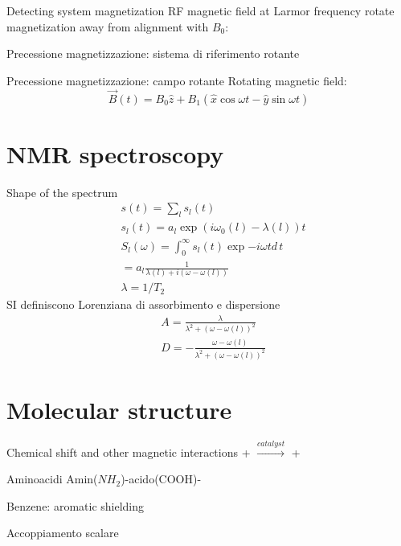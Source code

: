 \begin{frame}{Detecting system magnetization}
RF magnetic field at Larmor frequency rotate magnetization away from alignment with $B_0$:
\end{frame}

\begin{frame}{Precessione magnetizzazione: sistema di riferimento rotante}

\end{frame}

\begin{frame}{Precessione magnetizzazione: campo rotante}
   Rotating magnetic field:
   \begin{equation*}
   \vec{B}(t)=B_0\hat{z}+B_1(\hat{x}\cos{\omega t}-\hat{y}\sin{\omega t})
   \end{equation*}
\end{frame}

\section{NMR spectroscopy}

\begin{frame}{Shape of the spectrum}
    \begin{align*}
&s(t)=\sum_ls_l(t)\\
&s_l(t)=a_l\exp{(i\omega_0(l)-\lambda(l))t}\\
&S_l(\omega)=\int_0^{\infty}s_l(t)\exp{-i\omega t}d\,t\\
&=a_l\frac{1}{\lambda(l)+i(\omega-\omega(l))}\\
&\lambda=1/T_2
    \end{align*}
        SI definiscono Lorenziana di assorbimento e dispersione
    \begin{align*}
    &A=\frac{\lambda}{\lambda^2+(\omega-\omega(l))^2}\\
    &D=-\frac{\omega-\omega(l)}{\lambda^2+(\omega-\omega(l))^2}
    \end{align*}
\end{frame}

\section{Molecular structure}

\begin{frame}{Chemical shift and other magnetic interactions}
 \hspace{.5mm} + \hspace{.5mm}  \hspace{.5cm} $\xrightarrow{catalyst}$ \hspace{.5mm}  \hspace{.5mm} + \hspace{.5mm} 
\end{frame}

\begin{frame}{Aminoacidi}
Amin($NH_2$)-acido(COOH)-
\end{frame}

\begin{frame}{Benzene: aromatic shielding}
    
\end{frame}

\begin{frame}{Accoppiamento scalare}
    
\end{frame}